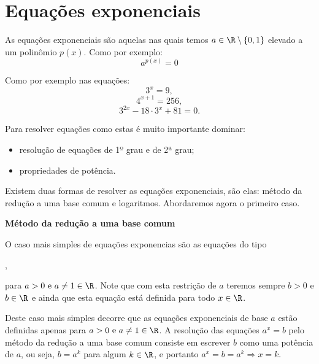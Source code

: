 \newpage
\section{Equações exponenciais}

  \vskip0.3cm
 \colorbox{azul}{
 \begin{minipage}{0.9\linewidth}
 \begin{center}
  As equações exponenciais são aquelas nas quais temos $a \in \R \setminus \{0, 1\}$ elevado a um polinômio $p(x)$. Como por exemplo:
  \[a^{p(x)}= 0\]
 \end{center}
 \end{minipage}}
 \vskip0.3cm

 Como por exemplo nas equações:
\begin{equation}
3^x= 9 ,
\end{equation}
\begin{equation}
4^{x+1}= 256 ,
\end{equation}
\begin{equation}
3^{2x}- 18\cdot 3^x + 81=0 .
\end{equation}

 Para resolver equações como estas é muito importante dominar:
 \begin{itemize}
  \item resolução de equações de 1º grau e de 2ª grau;
  \item propriedades de potência.
 \end{itemize}

 Existem duas formas de resolver as equações exponenciais, são elas: método da redução a uma base comum e logaritmos. Abordaremos agora o primeiro caso.

 \vskip0.3cm

 \textbf{Método da redução a uma base comum}

 \vskip0.3cm

 O caso mais simples de equações exponencias são as equações do tipo
 
 ,

 para $a > 0 \text{ e } a \neq 1 \in \R$. Note que com esta restrição de $a$ teremos sempre $b > 0$ e $b \in \R$ e ainda que esta equação está definida para todo $x \in \R$.

 Deste caso mais simples decorre que as equações exponenciais de base $a$ estão definidas apenas para $a > 0 \text{ e } a \neq 1 \in \R$. A resolução das equações $a^x= b$ pelo método da redução a uma base comum consiste em escrever $b$ como uma potência de $a$, ou seja, $b= a^k$  para algum $k \in \R$, e portanto $a^{x}= b= a^{k} \Rightarrow x= k$.


